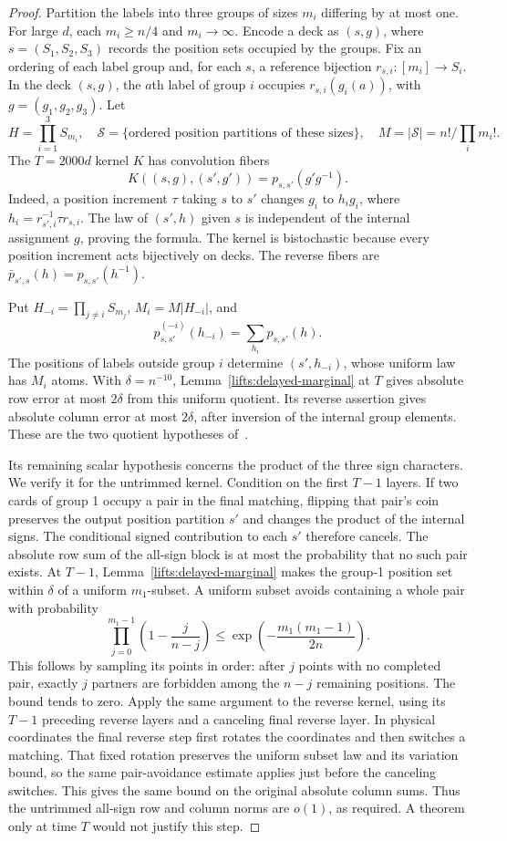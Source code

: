 \begin{proof}
Partition the labels into three groups of sizes $m_i$ differing by
at most one. For large $d$, each $m_i\ge n/4$ and $m_i\to\infty$.
Encode a deck as $(s,g)$, where $s=(S_1,S_2,S_3)$ records the
position sets occupied by the groups. Fix an ordering of each label
group and, for each $s$, a reference bijection
$r_{s,i}:[m_i]\to S_i$. In the deck $(s,g)$, the $a$th label of
group $i$ occupies $r_{s,i}(g_i(a))$, with
$g=(g_1,g_2,g_3)$. Let
\[
 H=\prod_{i=1}^3 S_{m_i},\quad
 \mathcal S=\{\text{ordered position partitions of these sizes}\},
 \quad M=|\mathcal S|=n!/\prod_i m_i!.
\]
The $T=2000d$ kernel $K$ has convolution fibers
\[
 K((s,g),(s',g'))=p_{s,s'}(g'g^{-1}).
\]
Indeed, a position increment $\tau$ taking $s$ to $s'$ changes
$g_i$ to $h_i g_i$, where
$h_i=r_{s',i}^{-1}\tau r_{s,i}$. The law of $(s',h)$ given $s$
is independent of the internal assignment $g$, proving the formula.
The kernel is bistochastic because every position increment acts
bijectively on decks. The reverse fibers are
$\bar p_{s',s}(h)=p_{s,s'}(h^{-1})$.

Put $H_{-i}=\prod_{j\ne i}S_{m_j}$, $M_i=M|H_{-i}|$, and
\[
 p^{(-i)}_{s,s'}(h_{-i})=\sum_{h_i}p_{s,s'}(h).
\]
The positions of labels outside group $i$ determine $(s',h_{-i})$,
whose uniform law has $M_i$ atoms. With $\delta=n^{-10}$,
Lemma~\ref{lifts:delayed-marginal} at $T$ gives absolute row error
at most $2\delta$ from this uniform quotient. Its reverse assertion
gives absolute column error at most $2\delta$, after inversion of
the internal group elements. These are the two quotient hypotheses
of~\cite[Theorem~\ref*{l-l:three-group}]{partialFourier}.

Its remaining scalar hypothesis concerns the product of the three
sign characters. We verify it for the untrimmed kernel. Condition
on the first $T-1$ layers. If two cards of group 1 occupy a pair
in the final matching, flipping that pair's coin preserves the
output position partition $s'$ and changes the product of the
internal signs. The conditional signed contribution to each $s'$
therefore cancels. The absolute row sum of the all-sign block is
at most the probability that no such pair exists. At $T-1$,
Lemma~\ref{lifts:delayed-marginal} makes the group-1 position set
within $\delta$ of a uniform $m_1$-subset. A uniform subset avoids
containing a whole pair with probability
\[
 \prod_{j=0}^{m_1-1}\left(1-\frac{j}{n-j}\right)
 \le\exp\left(-\frac{m_1(m_1-1)}{2n}\right).
\]
This follows by sampling its points in order: after $j$ points with
no completed pair, exactly $j$ partners are forbidden among the
$n-j$ remaining positions. The bound tends to zero. Apply the
same argument to the reverse kernel, using its $T-1$ preceding
reverse layers and a canceling final reverse layer. In physical
coordinates the final reverse step first rotates the coordinates and
then switches a matching. That fixed rotation preserves the uniform
subset law and its variation bound, so the same pair-avoidance estimate
applies just before the canceling switches. This gives the
same bound on the original absolute column sums. Thus the untrimmed
all-sign row and column norms are $o(1)$, as required. A theorem
only at time $T$ would not justify this step.


\end{proof}
